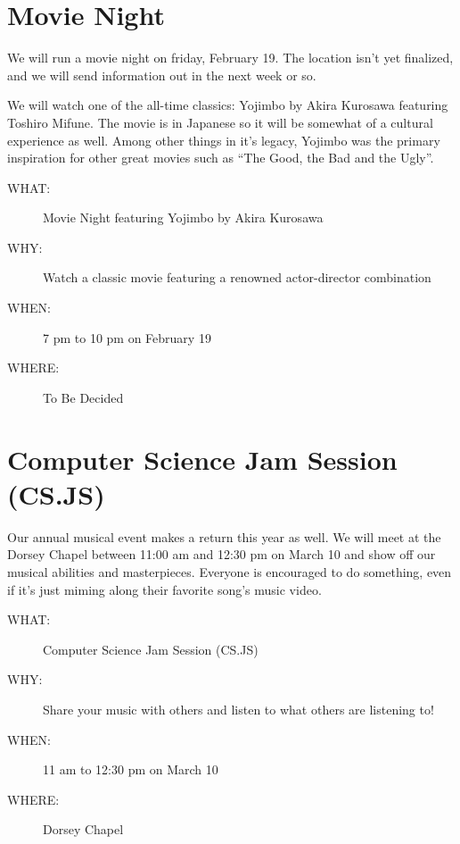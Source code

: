 \newpage


\section{Movie Night}
\label{sec-6}

We will run a movie night on friday, February 19. The location isn't yet
finalized, and we will send information out in the next week or so.

We will watch one of the all-time classics: Yojimbo by Akira Kurosawa featuring
Toshiro Mifune. The movie is in Japanese so it will be somewhat of a cultural
experience as well. Among other things in it's legacy, Yojimbo was the primary
inspiration for other great movies such as \textquotedblleft{}The Good, the Bad and the
Ugly\textquotedblright{}.

\begin{description}
\item[{WHAT:}] Movie Night featuring Yojimbo by Akira Kurosawa
\item[{WHY:}] Watch a classic movie featuring a renowned actor-director combination
\item[{WHEN:}] 7 pm to 10 pm on February 19
\item[{WHERE:}] To Be Decided
\end{description}


\newpage


\section{Computer Science Jam Session (CS.JS)}
\label{sec-7}

Our annual musical event makes a return this year as well. We will meet at the
Dorsey Chapel between 11:00 am and 12:30 pm on March 10 and show off our
musical abilities and masterpieces. Everyone is encouraged to do something,
even if it's just miming along their favorite song's music video.

\begin{description}
\item[{WHAT:}] Computer Science Jam Session (CS.JS)
\item[{WHY:}] Share your music with others and listen to what others are listening to!
\item[{WHEN:}] 11 am to 12:30 pm on March 10
\item[{WHERE:}] Dorsey Chapel
\end{description}


\newpage


